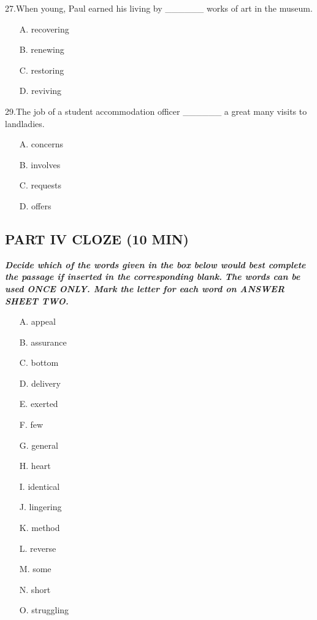 \documentclass[UTF8,11pt]{ctexart}
\begin{document}
27.When young, Paul earned his living by \_\_\_\_\_\_ works of art in the museum.


\begin{itemize}[leftmargin=2em,itemsep=.2em,topsep=.4em]\item[A.] recovering
\item[B.] renewing
\item[C.] restoring
\item[D.] reviving
\end{itemize}

29.The job of a student accommodation officer \_\_\_\_\_\_ a great many visits to landladies.


\begin{itemize}[leftmargin=2em,itemsep=.2em,topsep=.4em]\item[A.] concerns
\item[B.] involves
\item[C.] requests
\item[D.] offers
\end{itemize}

\subsection*{\textbf{PART} \textbf{IV CLOZE (10 MIN)}}


\textbf{\textit{Decide which of the words given in the box below would best complete the passage if inserted in the corresponding blank.}} \textbf{\textit{The words can be used ONCE ONLY. Mark the letter for each word on ANSWER SHEET TWO.}}


\begin{itemize}[leftmargin=2em,itemsep=.2em,topsep=.4em]\item[A.] appeal
\item[B.] assurance
\item[C.] bottom
\item[D.] delivery
\item[E.] exerted
\item[F.] few
\item[G.] general
\item[H.] heart
\item[I.] identical
\item[J.] lingering
\item[K.] method
\item[L.] reverse
\item[M.] some
\item[N.] short
\item[O.] struggling
\end{itemize}
\end{document}
